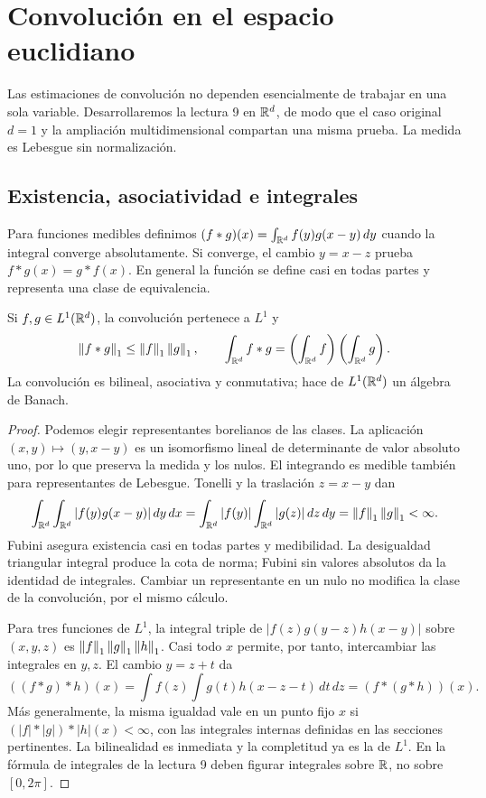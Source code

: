 \chapter{Convolución en el espacio euclidiano}\label{cap:v4-06}
Las estimaciones de convolución no dependen esencialmente de trabajar en una sola variable. Desarrollaremos la lectura 9 en $\mathbb R^d$, de modo que el caso original $d=1$ y la ampliación multidimensional compartan una misma prueba. La medida es Lebesgue sin normalización.

\section{Existencia, asociatividad e integrales}\label{lectura:v4-09}
Para funciones medibles definimos $(f*g)(x)=\int_{\mathbb R^d}f(y)g(x-y)\,dy$ cuando la integral converge absolutamente. Si converge, el cambio $y=x-z$ prueba $f*g(x)=g*f(x)$. En general la función se define casi en todas partes y representa una clase de equivalencia.
\begin{teorema}\label{v4:conv-Rn}
Si $f,g\in L^1(\mathbb R^d)$, la convolución pertenece a $L^1$ y
\[
 \left\lVert f*g\right\rVert_1\leq\left\lVert f\right\rVert_1\left\lVert g\right\rVert_1,\qquad
 \int_{\mathbb R^d}f*g=\left(\int_{\mathbb R^d}f\right)\left(\int_{\mathbb R^d}g\right).
\]
La convolución es bilineal, asociativa y conmutativa; hace de $L^1(\mathbb R^d)$ un álgebra de Banach.
\end{teorema}
\begin{proof}
Podemos elegir representantes borelianos de las clases. La aplicación $(x,y)\mapsto(y,x-y)$ es un isomorfismo lineal de determinante de valor absoluto uno, por lo que preserva la medida y los nulos. El integrando es medible también para representantes de Lebesgue. Tonelli y la traslación $z=x-y$ dan
\[
 \int_{\mathbb R^d}\int_{\mathbb R^d}|f(y)g(x-y)|\,dy\,dx
 =\int_{\mathbb R^d}|f(y)|\int_{\mathbb R^d}|g(z)|\,dz\,dy
 =\left\lVert f\right\rVert_1\left\lVert g\right\rVert_1<\infty.
\]
Fubini asegura existencia casi en todas partes y medibilidad. La desigualdad triangular integral produce la cota de norma; Fubini sin valores absolutos da la identidad de integrales. Cambiar un representante en un nulo no modifica la clase de la convolución, por el mismo cálculo.

Para tres funciones de $L^1$, la integral triple de $|f(z)g(y-z)h(x-y)|$ sobre $(x,y,z)$ es $\left\lVert f\right\rVert_1\left\lVert g\right\rVert_1\left\lVert h\right\rVert_1$. Casi todo $x$ permite, por tanto, intercambiar las integrales en $y,z$. El cambio $y=z+t$ da
\[
 ((f*g)*h)(x)=\int f(z)\int g(t)h(x-z-t)\,dt\,dz=(f*(g*h))(x).
\]
Más generalmente, la misma igualdad vale en un punto fijo $x$ si $(|f|*|g|)*|h|(x)<\infty$, con las integrales internas definidas en las secciones pertinentes. La bilinealidad es inmediata y la completitud ya es la de $L^1$. En la fórmula de integrales de la lectura 9 deben figurar integrales sobre $\mathbb R$, no sobre $[0,2\pi]$.
\end{proof}

